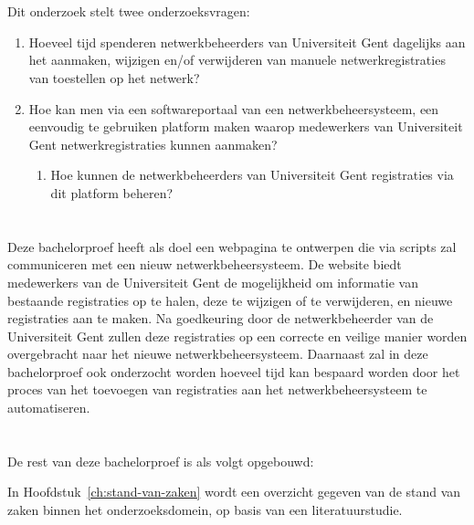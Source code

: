 \section{}%
\label{sec:onderzoeksvraag}
Dit onderzoek stelt twee onderzoeksvragen:
\begin{enumerate}
    \item Hoeveel tijd spenderen netwerkbeheerders van Universiteit Gent dagelijks aan het aanmaken, wijzigen en/of verwijderen van manuele netwerkregistraties van toestellen op het netwerk?
    \item Hoe kan men via een softwareportaal van een netwerkbeheersysteem, een eenvoudig te gebruiken platform maken waarop medewerkers van Universiteit Gent netwerkregistraties kunnen aanmaken?
    \begin{enumerate}
        \item Hoe kunnen de netwerkbeheerders van Universiteit Gent registraties via dit platform beheren?
    \end{enumerate}
\end{enumerate}

\section{}%
\label{sec:onderzoeksdoelstelling}
Deze bachelorproef heeft als doel een webpagina te ontwerpen die via scripts zal communiceren met een nieuw netwerkbeheersysteem. De website biedt medewerkers van de Universiteit Gent de mogelijkheid om informatie van bestaande registraties op te halen, deze te wijzigen of te verwijderen, en nieuwe registraties aan te maken. Na goedkeuring door de netwerkbeheerder van de Universiteit Gent zullen deze registraties op een correcte en veilige manier worden overgebracht naar het nieuwe netwerkbeheersysteem. Daarnaast zal in deze bachelorproef ook onderzocht worden hoeveel tijd kan bespaard worden door het proces van het toevoegen van registraties aan het netwerkbeheersysteem te automatiseren.

\section{}%
\label{sec:opzet-bachelorproef}
De rest van deze bachelorproef is als volgt opgebouwd:

In Hoofdstuk~\ref{ch:stand-van-zaken} wordt een overzicht gegeven van de stand van zaken binnen het onderzoeksdomein, op basis van een literatuurstudie.

